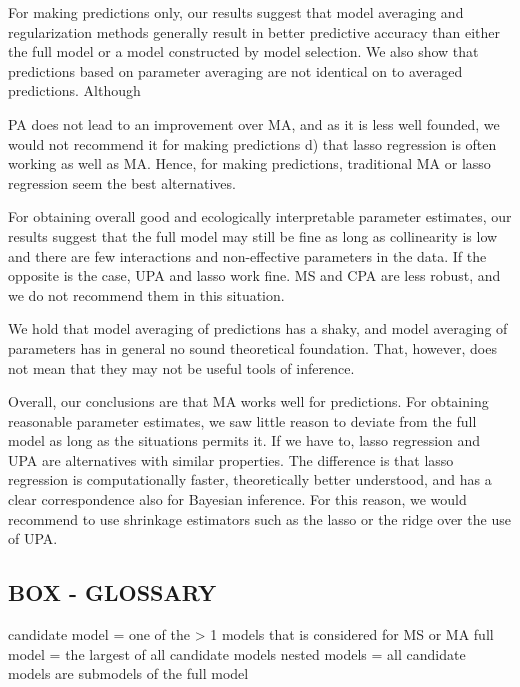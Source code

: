 \documentclass[5p]{elsarticle}
\begin{document}
For making predictions only, our results suggest that model averaging and regularization methods generally result in better predictive accuracy than either the full model or a model constructed by model selection. We also show that predictions based on parameter averaging are not identical on to averaged predictions. Although 


PA does not lead to an improvement over MA, and as it is less well founded, we would not recommend it for making predictions d) that lasso regression is often working as well as MA. Hence, for making predictions, traditional MA or lasso regression seem the best alternatives.

For obtaining overall good and ecologically interpretable parameter estimates, our results suggest that the full model may still be fine as long as collinearity is low and there are few interactions and non-effective parameters in the data. If the opposite is the case, UPA and lasso work fine. MS and CPA are less robust, and we do not recommend them in this situation.

We hold that model averaging of predictions has a shaky, and model averaging of parameters has in general no sound theoretical foundation. That, however, does not mean that they may not be useful tools of inference. 


Overall, our conclusions are that MA works well for predictions. For obtaining reasonable parameter estimates, we saw little reason to deviate from the full model as long as the situations permits it. If we have to, lasso regression and UPA are alternatives with similar properties. The difference is that lasso regression is computationally faster, theoretically better understood, and has a clear correspondence also for Bayesian inference. For this reason, we would recommend to use shrinkage estimators such as the lasso or the ridge over the use of UPA. 



%



\subsection{BOX - GLOSSARY}

candidate model = one of the > 1 models that is considered for MS or MA
full model = the largest of all candidate models
nested models = all candidate models are submodels of the full model
\end{document}
